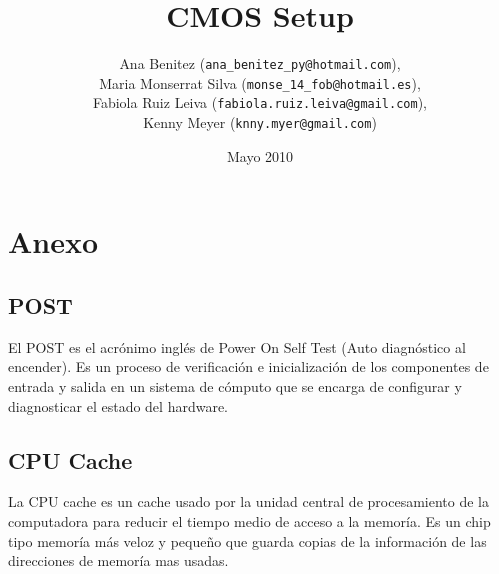 \documentclass[12pt,oneside,a4paper]{article}
\begin{document}
\title{CMOS Setup}
\author{Ana Benitez (\texttt{ana\_benitez\_py@hotmail.com}), \\
		Maria Monserrat Silva (\texttt{monse\_14\_fob@hotmail.es}), \\
		Fabiola Ruiz Leiva (\texttt{fabiola.ruiz.leiva@gmail.com}), \\ 
		Kenny Meyer (\texttt{knny.myer@gmail.com})}
\date{Mayo 2010}
\maketitle
\clearpage

%

% 
\setcounter{tocdepth}{3}
\tableofcontents
\newpage






\section{Anexo}\label{sec:anexo}
	\subsection{POST}\label{sub:post}
	
		El POST es el acrónimo inglés de Power On Self Test (Auto diagnóstico
		al encender). Es un proceso de verificación e inicialización de los
		componentes de entrada y salida en un sistema de cómputo que se encarga
		de configurar y diagnosticar el estado del hardware.

	\subsection{CPU Cache}\label{sub:cpu cache}
		
		La CPU cache es un cache usado por la unidad central de procesamiento
		de la computadora para reducir el tiempo medio de acceso a la memoría.
		Es un chip tipo memoría más veloz y pequeño que guarda copias de la
		información de las direcciones de memoría mas usadas.
		
\end{document}
